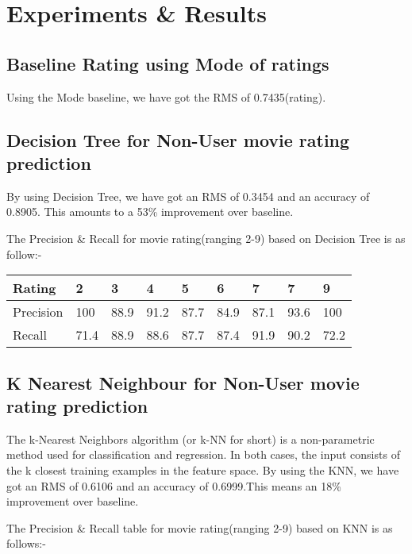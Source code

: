 \documentclass[11pt]{article}
\begin{document}
\section{Experiments & Results}

\subsection{Baseline Rating using Mode of ratings}
Using the Mode baseline, we have got the RMS of 0.7435(rating).


\subsection{Decision Tree for Non-User movie rating prediction}

By using Decision Tree, we have got an RMS of 0.3454 and an accuracy of 0.8905. This amounts to a 53\% improvement over baseline.

The Precision \& Recall for movie rating(ranging 2-9) based on Decision Tree is as follow:-
	\begin{table}[h]
	\centering
	\begin{tabular}{|l|l|l|l|l|l|l|l|l|}
	\hline
	Rating & 2 & 3 & 4 & 5 & 6 & 7 & 7 & 9\\
	\hline
	Precision & 100 & 88.9 & 91.2 & 87.7 & 84.9 & 87.1 & 93.6 & 100\\
	\hline
    Recall & 71.4 & 88.9 & 88.6 & 87.7 & 87.4 & 91.9 & 90.2 & 72.2\\
	\hline
	
	\end{tabular}
	\end{table}





\subsection{K Nearest Neighbour for Non-User movie rating prediction}

The k-Nearest Neighbors algorithm (or k-NN for short) is a non-parametric method used for classification and regression. In both cases, the input consists of the k closest training examples in the feature space.
			By using the KNN, we have got an RMS of 0.6106 and an accuracy of 0.6999.This means an 18\% improvement over baseline.



The Precision \& Recall table for movie rating(ranging 2-9) based on KNN is as follows:-\\
\end{document}
